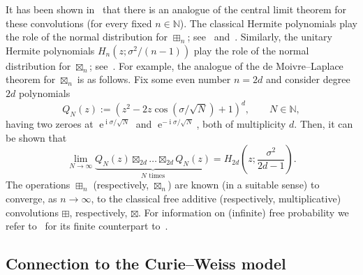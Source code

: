 \documentclass[10pt]{amsart}
\theoremstyle{definition}\newtheorem{defi}[theo]{Definition}\newtheorem{rema}[theo]{Remark}\newtheorem{exam}[theo]{Example}\newtheorem{exem}[theo]{Example}\newtheorem{nota}[theo]{Notation}
\DeclareMathOperator{\eee}{e}
\DeclareMathOperator{\ii}{i}
\newcommand{\N}{\mathbb{N}}
\begin{document}
It has been shown in~\cite{marcus,
mirabelli_diss,marcus_spielman_srivastava} that there is an analogue of the central limit theorem for these convolutions (for every fixed $n\in \N$). The classical Hermite polynomials play the role of the normal distribution for $\boxplus_n$; see~\cite[Theorem~6.7]{marcus} and~\cite[Theorems~3.2, 3.5]{mirabelli_diss}. Similarly, the unitary Hermite polynomials $H_n(z; \sigma^2/(n-1))$ play the role of the normal distribution for $\boxtimes_n$; see~\cite[Theorems~3.16, 3.23, 3.32]{mirabelli_diss}. For example, the analogue of the de Moivre--Laplace theorem for $\boxtimes_{n}$ is as follows. Fix some even number $n = 2d$ and consider degree~$2d$ polynomials
\[
Q_N(z) := \left(z^2 -2 z \cos (\sigma/\sqrt N) +1\right)^d, \qquad N\in \N,
\]
having two zeroes at $\eee^{\ii \sigma/ \sqrt N}$ and $\eee^{-\ii \sigma/ \sqrt N}$, both of multiplicity $d$. Then, it can be shown that
\[
\lim_{N\to\infty} \underbrace{Q_N(z) \boxtimes_{2d} \ldots \boxtimes_{2d} Q_N(z)}_{N \text{ times}} = H_{2d}\left(z; \frac{\sigma^2}{2d-1}\right).
\]
The operations $\boxplus_n$ (respectively, $\boxtimes_n$) are known (in a suitable sense) to converge, as $n\to\infty$, to the classical free additive (respectively, multiplicative) convolutions $\boxplus$, respectively, $\boxtimes$. For information on (infinite) free probability we refer to~\cite{nica_speicher_book,voiculescu_nica_dykema_book} for its finite counterpart to~\cite{arizmendi_perales,arizmendi_garza_vargas_perales,marcus,
mirabelli_diss,marcus_spielman_srivastava}.

\subsection{Connection to the Curie--Weiss model} 
\end{document}
